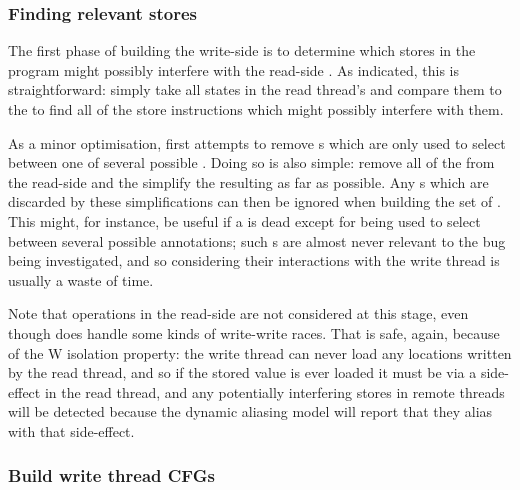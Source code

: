 \subsubsection{Finding relevant stores}

The first phase of building the write-side {\StateMachines} is to
determine which stores in the program might possibly interfere with
the read-side {\StateMachine}.  As indicated, this is straightforward:
simply take all  states in the read thread's
{\StateMachine} and compare them to the  to
find all of the store instructions which might possibly interfere with
them.

As a minor optimisation, {\implementation} first attempts to remove
s which are only used to select between one of several
possible .  Doing so is also simple: remove
all of the  from the read-side
{\StateMachine} and the simplify the resulting {\StateMachine} as far
as possible.  Any s which are discarded by these
simplifications can then be ignored when building the set of
.  This might, for instance, be useful if
a  is dead except for being used to select between several
possible  annotations; such s are
almost never relevant to the bug being investigated, and so
considering their interactions with the write thread is usually a
waste of time.  

Note that  operations in the read-side {\StateMachine}
are not considered at this stage, even though {\technique} does handle
some kinds of write-write races.  That is safe, again, because of the
W isolation property: the write thread can never load any locations
written by the read thread, and so if the stored value is ever loaded
it must be via a  side-effect in the read thread, and any
potentially interfering stores in remote threads will be detected
because the dynamic aliasing model will report that they alias with
that  side-effect.

\subsubsection{Build write thread CFGs}

